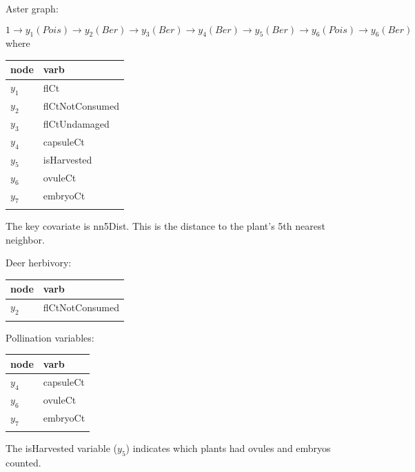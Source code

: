 \documentclass[
  ignorenonframetext,
]{beamer}
\begin{document}
\begin{frame}{}
\protect\hypertarget{section-48}{}
Aster graph:

\tiny

\[1 \rightarrow y_1 (Pois) \rightarrow y_2 (Ber) \rightarrow y_3 (Ber) \rightarrow y_4 (Ber) \rightarrow y_5(Ber) \rightarrow y_6(Pois) \rightarrow y_6(Ber)\]
where

\begin{longtable}[]{@{}ll@{}}
\toprule\noalign{}
node & varb \\
\midrule\noalign{}
\endhead
\(y_1\) & flCt \\
\(y_2\) & flCtNotConsumed \\
\(y_3\) & flCtUndamaged \\
\(y_4\) & capsuleCt \\
\(y_5\) & isHarvested \\
\(y_6\) & ovuleCt \\
\(y_7\) & embryoCt \\
\bottomrule\noalign{}
\end{longtable}

\normalsize

The key covariate is nn5Dist. This is the distance to the plant's 5th
nearest neighbor.
\end{frame}

\begin{frame}{}
\protect\hypertarget{section-49}{}
Deer herbivory:

\begin{longtable}[]{@{}ll@{}}
\toprule\noalign{}
node & varb \\
\midrule\noalign{}
\endhead
\(y_2\) & flCtNotConsumed \\
\bottomrule\noalign{}
\end{longtable}

\vspace{12pt}

Pollination variables:

\begin{longtable}[]{@{}ll@{}}
\toprule\noalign{}
node & varb \\
\midrule\noalign{}
\endhead
\(y_4\) & capsuleCt \\
\(y_6\) & ovuleCt \\
\(y_7\) & embryoCt \\
\bottomrule\noalign{}
\end{longtable}

\vspace{12pt}

The isHarvested variable (\(y_5\)) indicates which plants had ovules and
embryos counted.
\end{frame}
\end{document}
